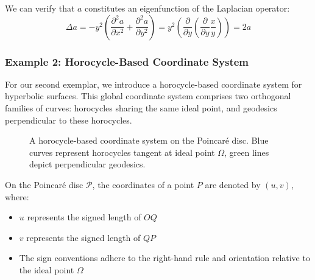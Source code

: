 \documentclass[12pt]{article}
\begin{document}
We can verify that $a$ constitutes an eigenfunction of the Laplacian operator:
$$
\Delta a = - y^2 \left(\frac{\partial^2 a}{\partial x^2} + \frac{\partial^2 a}{\partial y^2}\right) = y^2 \left(\frac{\partial}{\partial y} \left(\frac{\partial}{\partial y} \frac{x}{y}\right)\right) = 2a
$$

\subsubsection{Example 2: Horocycle-Based Coordinate System}

For our second exemplar, we introduce a horocycle-based coordinate system for hyperbolic surfaces. This global coordinate system comprises two orthogonal families of curves: horocycles sharing the same ideal point, and geodesics perpendicular to these horocycles.

\begin{figure}[ht]
\centering
{}
\caption{A horocycle-based coordinate system on the Poincaré disc. Blue curves represent horocycles tangent at ideal point $\Omega$, green lines depict perpendicular geodesics.}\label{fig:horocyclecoord-full}
\end{figure}

On the Poincaré disc $\mathcal{P}$, the coordinates of a point $P$ are denoted by $(u,v)$, where:
\begin{itemize}
\item $u$ represents the signed length of $OQ$
\item $v$ represents the signed length of $QP$
\item The sign conventions adhere to the right-hand rule and orientation relative to the ideal point $\Omega$
\end{itemize}
\end{document}
